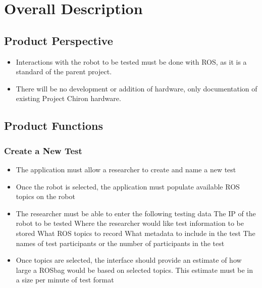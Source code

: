 \documentclass[onecolumn, draftclsnofoot,10pt, compsoc]{IEEEtran}
\begin{document}
\section{Overall Description}
\subsection{Product Perspective}
\begin{itemize}
	\item Interactions with the robot to be tested must be done with ROS, as it is a standard of the parent project.
	\item There will be no development or addition of hardware, only documentation of existing Project Chiron hardware.
\end{itemize}
\subsection{Product Functions}
\subsubsection{Create a New Test}
\begin{itemize}
	\item The application must allow a researcher to create and name a new test
	\item Once the robot is selected, the application must populate available ROS topics on the robot
	\item The researcher must be able to enter the following testing data
	\subitem The IP of the robot to be tested
	\subitem Where the researcher would like test information to be stored
	\subitem What ROS topics to record
	\subitem What metadata to include in the test
	\subitem The names of test participants or the number of participants in the test
	\item Once topics are selected, the interface should provide an estimate of how large a ROSbag would be based on selected topics. This estimate must be in a size per minute of test format
\end{itemize}
\end{document}
